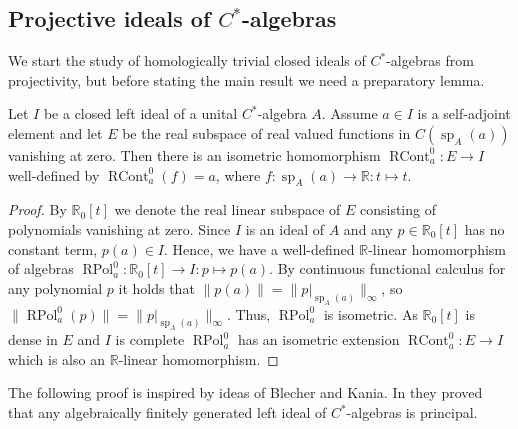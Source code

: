 
\subsection{
    Projective ideals of \texorpdfstring{$C^*$}{C*}-algebras}\label{
SubSectionProjectiveIdealsOfCStarAlgebras}

We start the study of homologically trivial closed ideals of $C^*$-algebras from
projectivity, but before stating the main result we need a preparatory lemma.

\begin{lemma}\label{ContFuncCalcOnIdealOfCStarAlg} Let $I$ be a closed left ideal of a
unital $C^*$-algebra $A$. Assume $a\in I$ is a self-adjoint element and let $E$
be the real subspace of real valued functions in $C(\operatorname{sp}_A(a))$
vanishing at zero. Then there is an isometric homomorphism
$\operatorname{RCont}_a^0:E\to I$ well-defined by
$\operatorname{RCont}_a^0(f)=a$, where
$f:\operatorname{sp}_A(a)\to\mathbb{R}:t\mapsto t$.
\end{lemma}
\begin{proof} By $\mathbb{R}_0[t]$ we denote the real linear subspace of $E$
consisting of polynomials vanishing at zero. Since $I$ is an ideal of $A$ and
any $p\in\mathbb{R}_0[t]$ has no constant term, $p(a)\in I$.  Hence, we have 
a well-defined $\mathbb{R}$-linear homomorphism of algebras
$\operatorname{RPol}_a^0:\mathbb{R}_0[t]\to I:p\mapsto p(a)$. By continuous
functional calculus for any polynomial $p$ 
it holds that $\lVert p(a)\rVert=\lVert p|_{\operatorname{sp}_A(a)}\rVert_\infty$, so
$\lVert\operatorname{RPol}_a^0(p)\rVert
=\lVert p|_{\operatorname{sp}_A(a)}\rVert_\infty$. 
Thus, $\operatorname{RPol}_a^0$ is isometric. 
As $\mathbb{R}_0[t]$ is dense in $E$ and $I$ is complete
$\operatorname{RPol}_a^0$ has an isometric extension
$\operatorname{RCont}_a^0:E\to I$ which is also an $\mathbb{R}$-linear
homomorphism. 
\end{proof}

The following proof is inspired by ideas of Blecher and Kania. In
\cite[lemma 2.1]{BleKanFinGenCStarAlgHilbMod} they proved that any
algebraically finitely generated left ideal of $C^*$-algebras is principal.  

